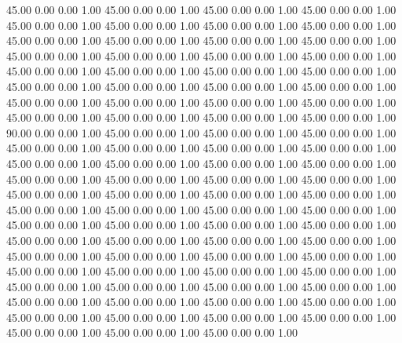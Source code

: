    45.00   0.00   0.00   1.00
   45.00   0.00   0.00   1.00
   45.00   0.00   0.00   1.00
   45.00   0.00   0.00   1.00
   45.00   0.00   0.00   1.00
   45.00   0.00   0.00   1.00
   45.00   0.00   0.00   1.00
   45.00   0.00   0.00   1.00
   45.00   0.00   0.00   1.00
   45.00   0.00   0.00   1.00
   45.00   0.00   0.00   1.00
   45.00   0.00   0.00   1.00
   45.00   0.00   0.00   1.00
   45.00   0.00   0.00   1.00
   45.00   0.00   0.00   1.00
   45.00   0.00   0.00   1.00
   45.00   0.00   0.00   1.00
   45.00   0.00   0.00   1.00
   45.00   0.00   0.00   1.00
   45.00   0.00   0.00   1.00
   45.00   0.00   0.00   1.00
   45.00   0.00   0.00   1.00
   45.00   0.00   0.00   1.00
   45.00   0.00   0.00   1.00
   45.00   0.00   0.00   1.00
   45.00   0.00   0.00   1.00
   45.00   0.00   0.00   1.00
   45.00   0.00   0.00   1.00
   45.00   0.00   0.00   1.00
   45.00   0.00   0.00   1.00
   45.00   0.00   0.00   1.00
   45.00   0.00   0.00   1.00
   90.00   0.00   0.00   1.00
   45.00   0.00   0.00   1.00
   45.00   0.00   0.00   1.00
   45.00   0.00   0.00   1.00
   45.00   0.00   0.00   1.00
   45.00   0.00   0.00   1.00
   45.00   0.00   0.00   1.00
   45.00   0.00   0.00   1.00
   45.00   0.00   0.00   1.00
   45.00   0.00   0.00   1.00
   45.00   0.00   0.00   1.00
   45.00   0.00   0.00   1.00
   45.00   0.00   0.00   1.00
   45.00   0.00   0.00   1.00
   45.00   0.00   0.00   1.00
   45.00   0.00   0.00   1.00
   45.00   0.00   0.00   1.00
   45.00   0.00   0.00   1.00
   45.00   0.00   0.00   1.00
   45.00   0.00   0.00   1.00
   45.00   0.00   0.00   1.00
   45.00   0.00   0.00   1.00
   45.00   0.00   0.00   1.00
   45.00   0.00   0.00   1.00
   45.00   0.00   0.00   1.00
   45.00   0.00   0.00   1.00
   45.00   0.00   0.00   1.00
   45.00   0.00   0.00   1.00
   45.00   0.00   0.00   1.00
   45.00   0.00   0.00   1.00
   45.00   0.00   0.00   1.00
   45.00   0.00   0.00   1.00
   45.00   0.00   0.00   1.00
   45.00   0.00   0.00   1.00
   45.00   0.00   0.00   1.00
   45.00   0.00   0.00   1.00
   45.00   0.00   0.00   1.00
   45.00   0.00   0.00   1.00
   45.00   0.00   0.00   1.00
   45.00   0.00   0.00   1.00
   45.00   0.00   0.00   1.00
   45.00   0.00   0.00   1.00
   45.00   0.00   0.00   1.00
   45.00   0.00   0.00   1.00
   45.00   0.00   0.00   1.00
   45.00   0.00   0.00   1.00
   45.00   0.00   0.00   1.00
   45.00   0.00   0.00   1.00
   45.00   0.00   0.00   1.00
   45.00   0.00   0.00   1.00
   45.00   0.00   0.00   1.00
   45.00   0.00   0.00   1.00
   45.00   0.00   0.00   1.00
   45.00   0.00   0.00   1.00
   45.00   0.00   0.00   1.00
